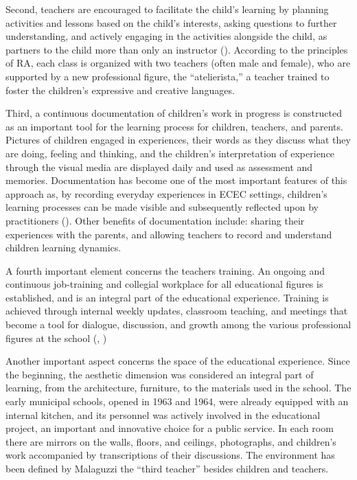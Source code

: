 \documentclass[12pt]{article}
\begin{document}
Second, teachers are encouraged to facilitate the child's learning by planning activities and lessons based on the child's interests, asking questions to further understanding, and actively engaging in the activities alongside the child, as partners to the child more than only an instructor (\cite{Hewett2001}). According to the principles of RA, each class is organized with two teachers (often male and female), who are supported by a new professional figure, the ``atelierista,'' a teacher trained to foster the children's expressive and creative languages.

Third, a continuous documentation of children's work in progress is constructed as an important tool for the learning process for children, teachers, and parents. Pictures of children engaged in experiences, their words as they discuss what they are doing, feeling and thinking, and the children's interpretation of experience through the visual media are displayed daily and used as assessment and memories. Documentation has become one of the most important features of this approach as, by recording everyday experiences in ECEC settings, children's learning processes can be made visible and subsequently reflected upon by practitioners (\cite{Picchio2014}).  Other benefits of documentation include: sharing their experiences with the parents, and allowing teachers to record and understand children learning dynamics.

A fourth important element concerns the teachers training. An ongoing and continuous job-training and collegial workplace for all educational figures is established, and is an integral part of the educational experience. Training is achieved through internal weekly updates, classroom teaching, and meetings that become a tool for dialogue, discussion, and growth among the various professional figures at the school (\cite{Bondioli2007}, \cite{Lazzari2013})

Another important aspect concerns the space of the educational experience. Since the beginning, the aesthetic dimension was considered an integral part of learning, from the architecture, furniture, to the materials used in the school. The early municipal schools, opened in 1963 and 1964, were already equipped with an internal kitchen, and its personnel was actively involved in the educational project, an important and innovative choice for a public service. In each room there are mirrors on the walls, floors, and ceilings, photographs, and children's work accompanied by transcriptions of their discussions. The environment has been defined by Malaguzzi the ``third teacher'' besides children and teachers.
\end{document}
